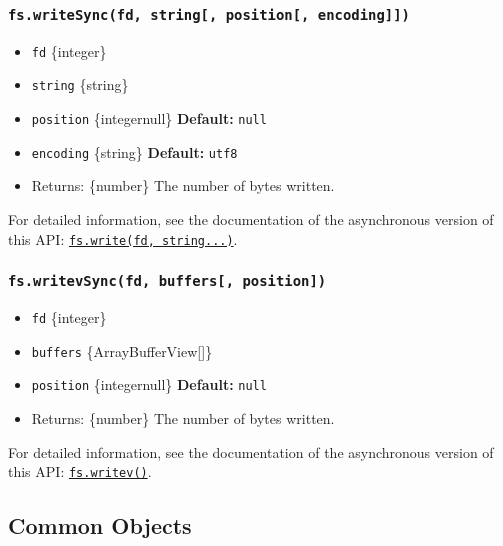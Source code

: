 \subsubsection{\texorpdfstring{\texttt{fs.writeSync(fd,\ string{[},\ position{[},\ encoding{]}{]})}}{fs.writeSync(fd, string{[}, position{[}, encoding{]}{]})}}\label{fs.writesyncfd-string-position-encoding}

\begin{itemize}
\tightlist
\item
  \texttt{fd} \{integer\}
\item
  \texttt{string} \{string\}
\item
  \texttt{position} \{integer\textbar null\} \textbf{Default:}
  \texttt{null}
\item
  \texttt{encoding} \{string\} \textbf{Default:}
  \texttt{\textquotesingle{}utf8\textquotesingle{}}
\item
  Returns: \{number\} The number of bytes written.
\end{itemize}

For detailed information, see the documentation of the asynchronous
version of this API:
\hyperref[fswritefd-string-position-encoding-callback]{\texttt{fs.write(fd,\ string...)}}.

\subsubsection{\texorpdfstring{\texttt{fs.writevSync(fd,\ buffers{[},\ position{]})}}{fs.writevSync(fd, buffers{[}, position{]})}}\label{fs.writevsyncfd-buffers-position}

\begin{itemize}
\tightlist
\item
  \texttt{fd} \{integer\}
\item
  \texttt{buffers} \{ArrayBufferView{[}{]}\}
\item
  \texttt{position} \{integer\textbar null\} \textbf{Default:}
  \texttt{null}
\item
  Returns: \{number\} The number of bytes written.
\end{itemize}

For detailed information, see the documentation of the asynchronous
version of this API:
\hyperref[fswritevfd-buffers-position-callback]{\texttt{fs.writev()}}.

\subsection{Common Objects}\label{common-objects}


